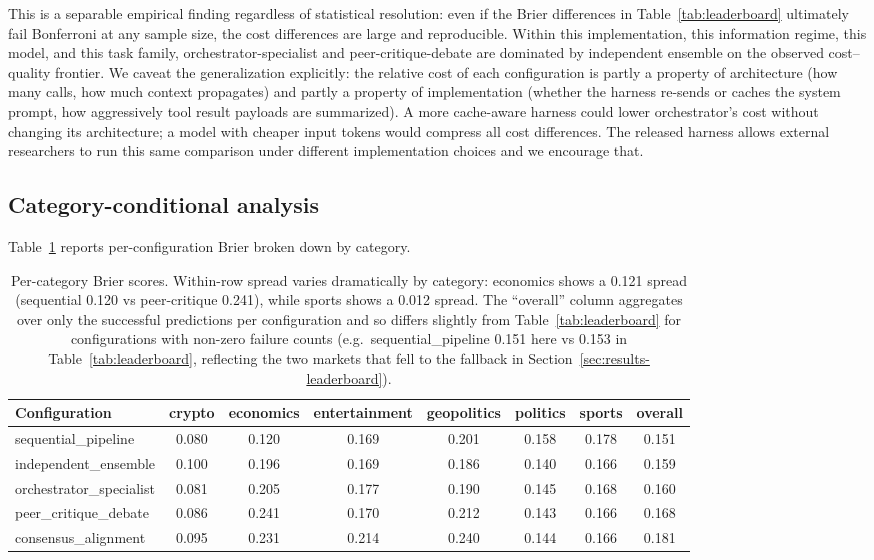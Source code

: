 \documentclass[11pt]{article}
\begin{document}
This is a separable empirical finding regardless of statistical resolution: even if the Brier differences in Table~\ref{tab:leaderboard} ultimately fail Bonferroni at any sample size, the cost differences are large and reproducible. Within this implementation, this information regime, this model, and this task family, orchestrator-specialist and peer-critique-debate are dominated by independent ensemble on the observed cost--quality frontier. We caveat the generalization explicitly: the relative cost of each configuration is partly a property of architecture (how many calls, how much context propagates) and partly a property of implementation (whether the harness re-sends or caches the system prompt, how aggressively tool result payloads are summarized). A more cache-aware harness could lower orchestrator's cost without changing its architecture; a model with cheaper input tokens would compress all cost differences. The released harness allows external researchers to run this same comparison under different implementation choices and we encourage that.

\subsection{Category-conditional analysis}
\label{sec:results-categories}

Table~\ref{tab:per-category} reports per-configuration Brier broken down by category.

\begin{table}[h]
\centering
\small
\begin{tabular}{lcccccc|c}
\toprule
Configuration & crypto & economics & entertainment & geopolitics & politics & sports & overall \\
\midrule
sequential\_pipeline      & 0.080 & 0.120 & 0.169 & 0.201 & 0.158 & 0.178 & 0.151 \\
independent\_ensemble     & 0.100 & 0.196 & 0.169 & 0.186 & 0.140 & 0.166 & 0.159 \\
orchestrator\_specialist  & 0.081 & 0.205 & 0.177 & 0.190 & 0.145 & 0.168 & 0.160 \\
peer\_critique\_debate    & 0.086 & 0.241 & 0.170 & 0.212 & 0.143 & 0.166 & 0.168 \\
consensus\_alignment      & 0.095 & 0.231 & 0.214 & 0.240 & 0.144 & 0.166 & 0.181 \\
\bottomrule
\end{tabular}
\caption{Per-category Brier scores. Within-row spread varies dramatically by category: economics shows a 0.121 spread (sequential 0.120 vs peer-critique 0.241), while sports shows a 0.012 spread. The ``overall'' column aggregates over only the successful predictions per configuration and so differs slightly from Table~\ref{tab:leaderboard} for configurations with non-zero failure counts (e.g.\ sequential\_pipeline 0.151 here vs 0.153 in Table~\ref{tab:leaderboard}, reflecting the two markets that fell to the fallback in Section~\ref{sec:results-leaderboard}).}
\label{tab:per-category}
\end{table}
\end{document}
